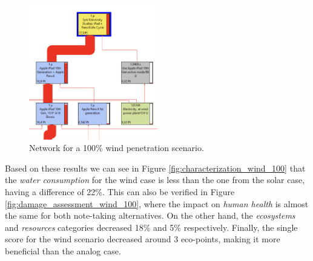 \begin{figure}[H]
    \centering
    \includegraphics[width=0.5\textwidth]{images/wind/Wind_network.png}
    \caption{Network for a 100\% wind penetration scenario.}\label{fig:windRES_network}
\end{figure}

Based on these results we can see in Figure \ref{fig:characterization_wind_100} that the \textit{water consumption} for the wind case is less than the one from the solar case, having a difference of 22\%. This can also be verified in Figure \ref{fig:damage_assessment_wind_100}, where the impact on \textit{human health} is almost the same for both note-taking alternatives. On the other hand, the \textit{ecosystems} and \textit{resources} categories decreased 18\% and 5\% respectively. Finally, the single score for the wind scenario decreased around 3 eco-points, making it more beneficial than the analog case.